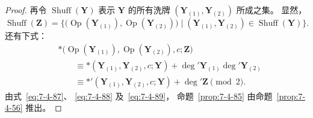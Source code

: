\begin{proof}
再令 $\operatorname{Shuff}(\mathbf Y)$
表示 $\mathbf Y$ 的所有洗牌
$(\mathbf Y_{(1)},\mathbf Y_{(2)})$
所成之集。
显然，
\[
\operatorname{Shuff}(\mathbf Z)
=
\bigl\{
\bigl(
\operatorname{Op}(\mathbf Y_{(1)}),
\operatorname{Op}(\mathbf Y_{(2)})
\bigr)
\mid
(\mathbf Y_{(1)},\mathbf Y_{(2)})
\in\operatorname{Shuff}(\mathbf Y)
\bigr\}.
\]
还有下式：
\begin{equation}
\begin{aligned}
&*\bigl(
\operatorname{Op}(\mathbf Y_{(1)}),
\operatorname{Op}(\mathbf Y_{(2)}),
c;\mathbf Z
\bigr)\\
&\qquad\equiv
*(\mathbf Y_{(1)},\mathbf Y_{(2)},c;\mathbf Y)
+\deg'\mathbf Y_{(1)}
\deg'\mathbf Y_{(2)}\\
&\qquad\equiv
*'(\mathbf Y_{(1)},\mathbf Y_{(2)},c;\mathbf Y)
+\deg'\mathbf Z
\pmod2.
\end{aligned}
\tag{7.4.89}\label{eq:7-4-89}
\end{equation}
由式~\eqref{eq:7-4-87}、
\eqref{eq:7-4-88}
及~\eqref{eq:7-4-89}，
命题~\ref{prop:7-4-85}
由命题~\ref{prop:7-4-56}
推出。
\end{proof}
